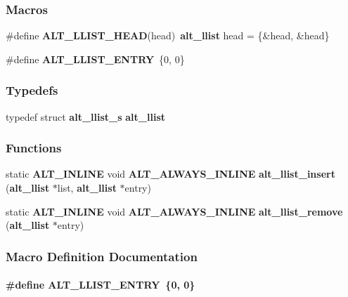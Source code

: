 \subsubsection*{Macros}
\begin{DoxyCompactItemize}
\item 
\#define {\bf A\+L\+T\+\_\+\+L\+L\+I\+S\+T\+\_\+\+H\+E\+AD}(head)~{\bf alt\+\_\+llist} head = \{\&head, \&head\}
\item 
\#define {\bf A\+L\+T\+\_\+\+L\+L\+I\+S\+T\+\_\+\+E\+N\+T\+RY}~\{0, 0\}
\end{DoxyCompactItemize}
\subsubsection*{Typedefs}
\begin{DoxyCompactItemize}
\item 
typedef struct {\bf alt\+\_\+llist\+\_\+s} {\bf alt\+\_\+llist}
\end{DoxyCompactItemize}
\subsubsection*{Functions}
\begin{DoxyCompactItemize}
\item 
static {\bf A\+L\+T\+\_\+\+I\+N\+L\+I\+NE} void {\bf A\+L\+T\+\_\+\+A\+L\+W\+A\+Y\+S\+\_\+\+I\+N\+L\+I\+NE} {\bf alt\+\_\+llist\+\_\+insert} ({\bf alt\+\_\+llist} $\ast$list, {\bf alt\+\_\+llist} $\ast$entry)
\item 
static {\bf A\+L\+T\+\_\+\+I\+N\+L\+I\+NE} void {\bf A\+L\+T\+\_\+\+A\+L\+W\+A\+Y\+S\+\_\+\+I\+N\+L\+I\+NE} {\bf alt\+\_\+llist\+\_\+remove} ({\bf alt\+\_\+llist} $\ast$entry)
\end{DoxyCompactItemize}


\subsubsection{Macro Definition Documentation}
\paragraph[{A\+L\+T\+\_\+\+L\+L\+I\+S\+T\+\_\+\+E\+N\+T\+RY}]{\setlength{\rightskip}{0pt plus 5cm}\#define A\+L\+T\+\_\+\+L\+L\+I\+S\+T\+\_\+\+E\+N\+T\+RY~\{0, 0\}}\label{alt__llist_8h_a61a3a1b5f1ceac89c5701dcec9924fb1}


